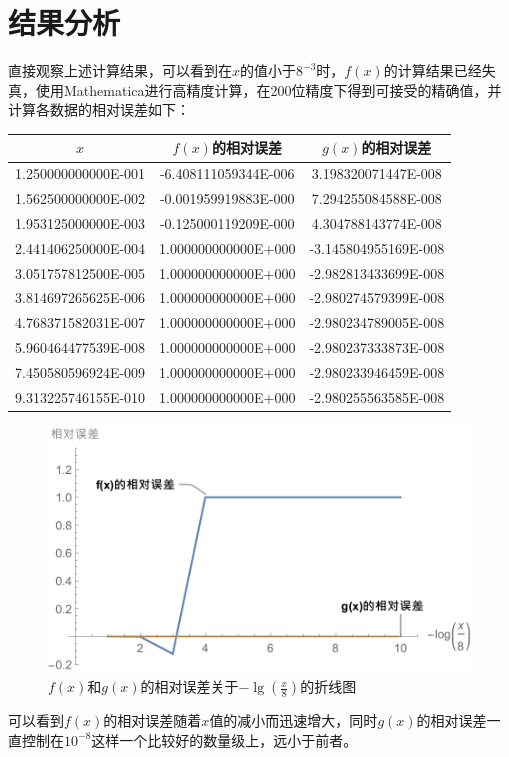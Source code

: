 \documentclass[11pt]{article}
\begin{document}
\section{结果分析}
直接观察上述计算结果，可以看到在$x$的值小于$8^{-3}$时，$f(x)$的计算结果已经失真，使用Mathematica进行高精度计算，在200位精度下得到可接受的精确值，并计算各数据的相对误差如下：
\begin{table}[h]
    \centering
    \begin{tabular}{|c|c|c|}
        \hline
        $x$                 & $f(x)$的相对误差     & $g(x)$的相对误差     \\ \hline
        1.250000000000E-001 & -6.408111059344E-006 & 3.198320071447E-008  \\ \hline
        1.562500000000E-002 & -0.001959919883E-000 & 7.294255084588E-008  \\ \hline
        1.953125000000E-003 & -0.125000119209E-000 & 4.304788143774E-008  \\ \hline
        2.441406250000E-004 & 1.000000000000E+000  & -3.145804955169E-008 \\ \hline
        3.051757812500E-005 & 1.000000000000E+000  & -2.982813433699E-008 \\ \hline
        3.814697265625E-006 & 1.000000000000E+000  & -2.980274579399E-008 \\ \hline
        4.768371582031E-007 & 1.000000000000E+000  & -2.980234789005E-008 \\ \hline
        5.960464477539E-008 & 1.000000000000E+000  & -2.980237333873E-008 \\ \hline
        7.450580596924E-009 & 1.000000000000E+000  & -2.980233946459E-008 \\ \hline
        9.313225746155E-010 & 1.000000000000E+000  & -2.980255563585E-008 \\ \hline
    \end{tabular}
\end{table}
\begin{figure}
    \centering
    \includegraphics[width = 0.7\columnwidth]{./Question1/Part1_RelativeError.pdf}
    \caption{$f(x)$和$g(x)$的相对误差关于$-\lg{\left(\frac{x}{8}\right)}$的折线图}
\end{figure}
可以看到$f(x)$的相对误差随着$x$值的减小而迅速增大，同时$g(x)$的相对误差一直控制在$10^{-8}$这样一个比较好的数量级上，远小于前者。
\end{document}
